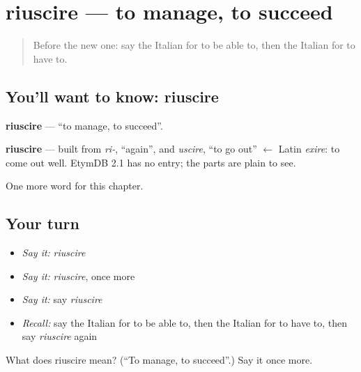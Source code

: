 \section[riuscire]{riuscire — to manage, to succeed}

\label{lesson:IT-C85-riuscire}



\begin{quote}
Before the new one: say the Italian for to be able to, then the Italian for to have to.
\end{quote}

\subsection*{You'll want to know: riuscire}
\textbf{riuscire} — \textquotedblleft{}to manage, to succeed\textquotedblright{}.

\begin{cousinweb}
\textbf{riuscire} — built from \emph{ri-}, \textquotedblleft{}again\textquotedblright{}, and \emph{uscire}, \textquotedblleft{}to go out\textquotedblright{} $\leftarrow$ Latin \emph{exire}: to come out well. EtymDB 2.1 has no entry; the parts are plain to see.
\end{cousinweb}

\begin{grammarlens}[title={What you've built}]
One more word for this chapter.
\end{grammarlens}

\subsection*{Your turn}
\begin{itemize}
\raggedright
  \item \emph{Say it:} \emph{riuscire}
  \item \emph{Say it:} \emph{riuscire}, once more
  \item \emph{Say it:} say \emph{riuscire}
  \item \emph{Recall:} say the Italian for to be able to, then the Italian for to have to, then say \emph{riuscire} again
\end{itemize}

\begin{tcolorbox}[breakable,colback=teal!4,colframe=teal!35!black,title={Before you move on}]
What does riuscire mean? (\textquotedblleft{}To manage, to succeed\textquotedblright{}.) Say it once more.
\end{tcolorbox}
